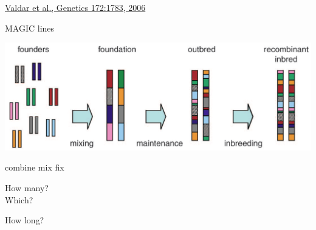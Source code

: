 \documentclass[12pt]{article}
\newcommand{\citesize}{\fontsize{14}{18} \selectfont}
\newcommand{\headsize}{\fontsize{35}{35} \selectfont}
\newcommand{\smallsize}{\fontsize{25}{30} \selectfont}
\newcommand{\smallersize}{\fontsize{20}{25} \selectfont}
\begin{document}
{\vfill

\hfill {\citesize \color{citecolor} \href{http://www.genetics.org/content/172/3/1783.full}{Valdar et al., Genetics 172:1783, 2006}}

\vspace*{5mm}


\newpage


\addtocounter{page}{-1}

\headsize \color{myyellow}
\hfill \begin{minipage}{5.75in}
\centering
MAGIC lines
\end{minipage}

\vspace{20mm}

\centerline{\includegraphics[width=10in]{Figs/valdar_genet2006.png}}

\smallsize \color{myyellow}
\hspace*{52mm} combine \hspace*{35mm} mix \hspace*{52mm} fix

\smallersize
\color{mywhite}
\vspace{20pt}

\hspace*{6mm}
\begin{minipage}[t]{45mm}
\vspace*{0mm}
\centering

How many? \\[20pt]
Which?
\end{minipage}
\hspace{57mm}
\begin{minipage}[t]{45mm}
\vspace*{0mm}
\centering

How long?
\end{minipage}
\hspace{18mm}
\begin{minipage}[t]{45mm}
\vspace*{0mm}
\centering


\end{minipage}}
\end{document}
